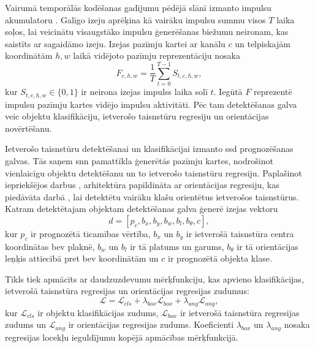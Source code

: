 Vairumā temporālās kodēšanas gadījumu pēdējā slānī izmanto impulsu akumulatoru \cite{Fang2021, kim2021, rathi2020}. Galīgo
izeju aprēķina kā vairāku impulsu summu visos \(T\) laika soļos, lai veicinātu visaugstāko impulsu ģenerēšanas biežumu
neironam, kas saistīts ar sagaidāmo izeju.
Izejas pazīmju kartei ar kanālu \(c\) un telpiskajām koordinātām \(h,
w\) laikā vidējoto pazīmju reprezentāciju nosaka
\begin{equation}
    F_{c,h,w} =
    \frac{1}{T}\sum_{t=0}^{T-1} S_{t,c,h,w},
\end{equation}
kur \(S_{t,c,h,w}\in\{0,1\}\) ir neirona izejas impulss laika solī \(t\). Iegūtā \(F\) reprezentē impulsu pazīmju kartes vidējo impulsu aktivitāti. Pēc tam detektēšanas galva veic objektu klasifikāciju, ietverošo taisnstūru regresiju un orientācijas novērtēšanu.

Ietverošo taisnstūru detektēšanai un klasifikācijai izmanto \Gls{ssd} \cite{liu2016} prognozēšanas galvas. Tās saņem \Gls{snn} pamattīkla ģenerētās pazīmju kartes, nodrošinot vienlaicīgu objektu detektēšanu un to ietverošo taisnstūru regresiju. Paplašinot iepriekšējos darbus \cite{Cordone2022, fan2025}, arhitektūra papildināta ar orientācijas regresiju, kas piedāvāta darbā \cite{simony2018}, lai detektētu vairāku klašu orientētus ietverošos taisnstūrus. Katram detektētajam objektam detektēšanas galva ģenerē izejas vektoru
\begin{equation}
    d = [p_c, b_x, b_y, b_w, b_l, b_\theta, c],
\end{equation}
kur \(p_c\) ir prognozētā ticamības vērtība, \(b_x\) un \(b_y\) ir ietverošā taisnstūra centra koordinātas \Gls{bev} plaknē, \(b_w\) un \(b_l\) ir tā platums un garums, \(b_\theta\) ir tā orientācijas leņķis attiecībā pret \Gls{bev} koordinātām un \(c\) ir prognozētā objekta klase.

Tīkls tiek apmācīts ar daudzuzdevumu mērķfunkciju, kas apvieno klasifikācijas, ietverošā taisnstūra regresijas un orientācijas regresijas zudumus:
\begin{equation}
  \mathcal{L} =
  \mathcal{L}_{cls}
  + \lambda_{box}\mathcal{L}_{box}
  + \lambda_{ang}\mathcal{L}_{ang},
\end{equation}
kur \(\mathcal{L}_{cls}\) ir objektu klasifikācijas zudums, \(\mathcal{L}_{box}\) ir ietverošā taisnstūra regresijas zudums un \(\mathcal{L}_{ang}\) ir orientācijas regresijas zudums. Koeficienti \(\lambda_{box}\) un \(\lambda_{ang}\) nosaka regresijas locekļu ieguldījumu kopējā apmācības mērķfunkcijā.

